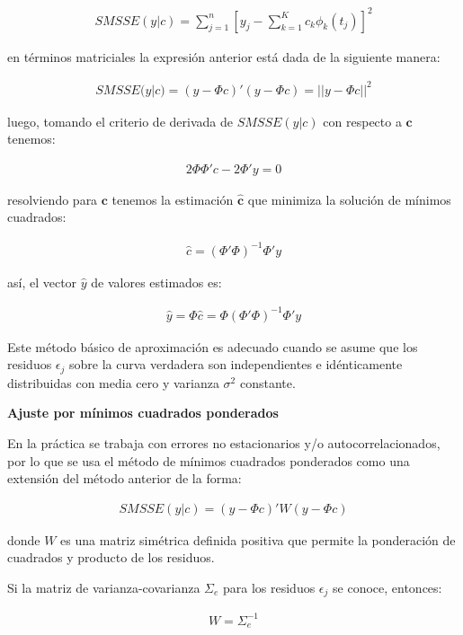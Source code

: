 \documentclass[
]{book}
\begin{document}
\begin{align}
    SMSSE(y|c)=\sum_{j=1}^n[y_j-\sum_{k=1}^Kc_k\phi_k(t_j)]^2
\end{align}

en términos matriciales la expresión anterior está dada de la siguiente manera:

\begin{align}
    SMSSE(y|c)=(y-\Phi c)'(y-\Phi c)=||y-\Phi c||^2
\end{align}

luego, tomando el criterio de derivada de \(SMSSE(y|c)\) con respecto a \(\textbf{c}\) tenemos:

\begin{align}
    2\Phi \Phi'c-2\Phi'y=0
\end{align}

resolviendo para \(\textbf{c}\) tenemos la estimación \({\hat{\textbf{c}}}\) que minimiza la solución de mínimos cuadrados:

\begin{align}
    {\hat{c}}=(\Phi'\Phi)^{-1}\Phi'y
\end{align}

así, el vector \({\hat{y}}\) de valores estimados es:

\begin{align}
    {\hat{y}}=\Phi {\hat{c}}=\Phi(\Phi'\Phi)^{-1}\Phi'y
\end{align}

Este método básico de aproximación es adecuado cuando se asume que los residuos \(\epsilon_j\) sobre la curva verdadera son independientes e idénticamente distribuidas con media cero y varianza \(\sigma^2\) constante.

\textbf{Ajuste por mínimos cuadrados ponderados}

En la práctica se trabaja con errores no estacionarios y/o autocorrelacionados, por lo que se usa el método de mínimos cuadrados ponderados como una extensión del método anterior de la forma:

\begin{align}
    SMSSE(y|c)=(y-\Phi c)'W(y-\Phi c)
\end{align}

donde \(W\) es una matriz simétrica definida positiva que permite la ponderación de cuadrados y producto de los residuos.

Si la matriz de varianza-covarianza \(\Sigma_e\) para los residuos \(\epsilon_j\) se conoce, entonces:

\begin{align}
    W=\Sigma_e^{-1}
\end{align}
\end{document}

